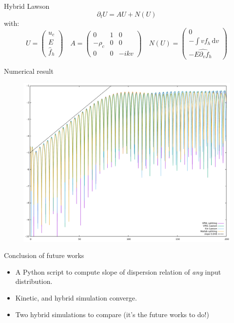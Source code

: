\documentclass{beamer}
\begin{document}
\begin{frame}{Hybrid Lawson}
  $$
    \partial_t U = AU + N(U)
  $$
  with:
  $$
    U = \begin{pmatrix}u_c \\ E \\ \hat{f}_h\end{pmatrix}
    \quad
    A = \begin{pmatrix}0 & 1 & 0 \\ -\rho_c & 0 & 0 \\ 0 & 0 & -ikv \end{pmatrix}
    \quad
    N(U) = \begin{pmatrix}0 \\ -\int vf_h\,\mathrm{d}v \\ -\widehat{E\partial_vf_h} \end{pmatrix}
  $$
\end{frame}
\begin{frame}{Numerical result}
  \begin{figure}\centering
    \includegraphics[height=0.8\textheight]{img/electric_energy.pdf}
  \end{figure}
\end{frame}
\begin{frame}{Conclusion of future works}
  \begin{itemize}
    \item A Python script to compute slope of dispersion relation of \emph{any} input distribution.
    \item Kinetic, and hybrid simulation converge.
    \item Two hybrid simulations to compare (it's the future works to do!)
  \end{itemize}
\end{frame}
\end{document}
